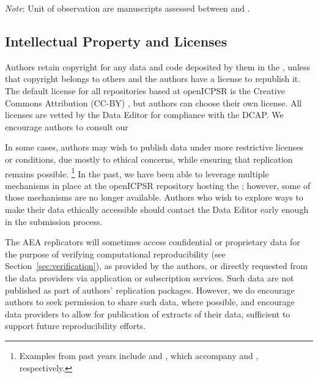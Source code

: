\begin{center}
    \label{tab:updates}
    
     \begin{threeparttable}
     
 
    \begin{tablenotes}
    \footnotesize
    \item[] \textit{Note}: Unit of observation are manuscripts assessed between \firstday{} and \lastday{}. 
    \end{tablenotes}
    \end{threeparttable}
\end{center}

\subsection{Intellectual Property and Licenses} 
\label{sec:ip}

Authors retain  copyright for any data and code deposited by them in the \aeadcr{}, unless that copyright belongs to others and the authors have a license to republish it. The default license for all repositories based at openICPSR is the  Creative Commons Attribution (CC-BY) \citep{CreativeCommons2017}, but authors can choose their own license. All  licenses  are vetted by the Data Editor for compliance with the \ac{DCAP}. We encourage authors to consult our  

In some cases, authors may wish to publish data under more restrictive licenses or conditions, due  mostly to ethical concerns, while ensuring that replication remains possible.%
\footnote{Examples from past years include \citet{deryugina2021data} and \citet{goncalves2021data}, which accompany \citet{deryugina_covid-19_2021} and \citet{goncalves_few_2021}, respectively.}
In the past, we have been able to leverage multiple mechanisms in place at the openICPSR repository hosting the \aeadcr{}; however, some of those mechanisms are no longer available. Authors who wish to explore ways to make their data ethically accessible should contact the Data Editor early enough in the submission process. 

The AEA replicators will sometimes access confidential or proprietary data for the purpose of verifying computational reproducibility (see Section~\ref{sec:verification}), as provided by the authors, or directly requested from the data providers via application or subscription services. Such data are not published as part of authors' replication packages. However, we do encourage authors to seek permission to share such data, where possible, and encourage data providers to allow for publication of extracts of their data, sufficient to support future reproducibility efforts.

